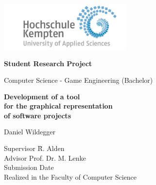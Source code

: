\thispagestyle{empty}



\vspace*{-20mm}
\begin{flushright}
\includegraphics[width=0.5\textwidth]{Bilder/LogoHS.png}
\end{flushright}


\vspace*{2cm}

\begin{center}
{\Large \textbf{Student Research Project}}\\ 

\vspace*{1cm}

{\large Computer Science - Game Engineering (Bachelor)\\[1mm]}

\vspace{1cm}

{\Large \bfseries Development of a tool \\
				  for the graphical representation \\
				  of software projects \\}


\vspace{1.5cm}

{\large Daniel Wildegger}\\[40mm]

\end{center}

\vfill

\parbox{120mm}{
\begin{tabbing}
Supervisor \hspace{1.2cm}    \= R. Alden\\
Advisor						\> Prof. Dr. M. Lenke\\
Submission Date             \> \\
Realized in the             \> Faculty of Computer Science\\[4mm]
\end{tabbing}
}

